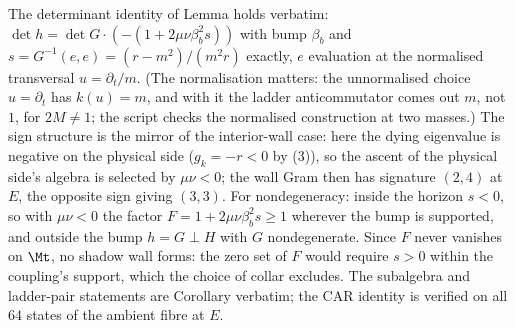 The determinant identity of Lemma  holds verbatim: $\det h = \det G \cdot (-(1 + 2\mu\nu\beta_b^2 s))$ with bump $\beta_b$ and $s = G^{-1}(e,e) = (r - m^2)/(m^2 r)$ exactly, $e$ evaluation at the normalised transversal $u = \partial_t/m$. (The normalisation matters: the unnormalised choice $u = \partial_t$ has $k(u) = m$, and with it the ladder anticommutator comes out $m$, not $1$, for $2M \neq 1$; the script checks the normalised construction at two masses.) The sign structure is the mirror of the interior-wall case: here the dying eigenvalue is negative on the physical side ($g_k = -r < 0$ by (3)), so the ascent of the physical side's algebra is selected by $\mu\nu < 0$; the wall Gram then has signature $(2,4)$ at $E$, the opposite sign giving $(3,3)$. For nondegeneracy: inside the horizon $s < 0$, so with $\mu\nu < 0$ the factor $F = 1 + 2\mu\nu\beta_b^2 s \geq 1$ wherever the bump is supported, and outside the bump $h = G \perp H$ with $G$ nondegenerate. Since $F$ never vanishes on $\Mt$, no shadow wall forms: the zero set of $F$ would require $s > 0$ within the coupling's support, which the choice of collar excludes. The subalgebra and ladder-pair statements are Corollary  verbatim; the CAR identity is verified on all $64$ states of the ambient fibre at $E$.
